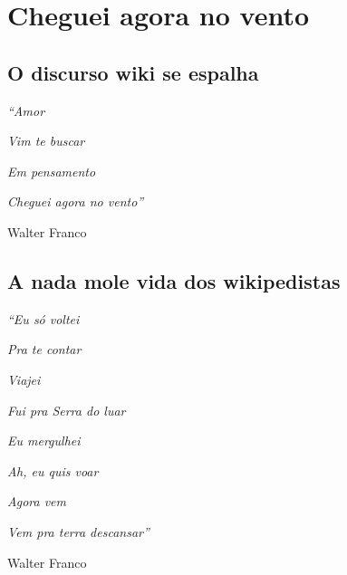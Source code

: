 \chapter{Cheguei agora no vento}

\section{O discurso wiki se espalha}


\singlespacing
\begin{flushright}
\textit{``Amor}

\textit{Vim te buscar}

\textit{Em pensamento}

\textit{Cheguei agora no vento''}

Walter Franco

\end{flushright}
\doublespacing




\newpage



\newpage

\section{A nada mole vida dos wikipedistas}

\singlespacing
\begin{flushright}
\textit{``Eu só voltei}

\textit{Pra te contar}

\textit{Viajei}

\textit{Fui pra Serra do luar}

\textit{Eu mergulhei}

\textit{Ah, eu quis voar}

\textit{Agora vem}

\textit{Vem pra terra descansar''}

Walter Franco

\end{flushright}
\doublespacing


\newpage

\newpage

\newpage






